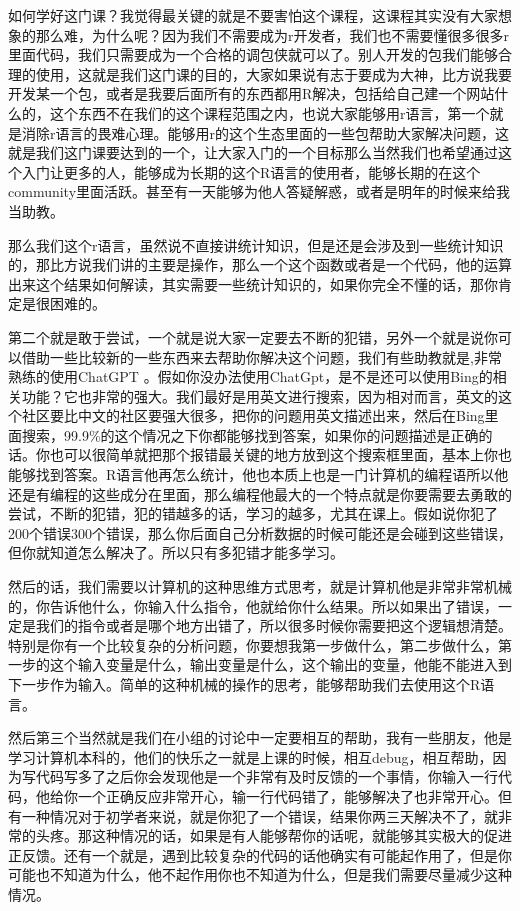\documentclass[
  oneside]{book}
\begin{document}
如何学好这门课？我觉得最关键的就是不要害怕这个课程，这课程其实没有大家想象的那么难，为什么呢？因为我们不需要成为r开发者，我们也不需要懂很多很多r里面代码，我们只需要成为一个合格的调包侠就可以了。别人开发的包我们能够合理的使用，这就是我们这门课的目的，大家如果说有志于要成为大神，比方说我要开发某一个包，或者是我要后面所有的东西都用R解决，包括给自己建一个网站什么的，这个东西不在我们的这个课程范围之内，也说大家能够用r语言，第一个就是消除r语言的畏难心理。能够用r的这个生态里面的一些包帮助大家解决问题，这就是我们这门课要达到的一个，让大家入门的一个目标那么当然我们也希望通过这个入门让更多的人，能够成为长期的这个R语言的使用者，能够长期的在这个community里面活跃。甚至有一天能够为他人答疑解惑，或者是明年的时候来给我当助教。

那么我们这个r语言，虽然说不直接讲统计知识，但是还是会涉及到一些统计知识的，那比方说我们讲的主要是操作，那么一个这个函数或者是一个代码，他的运算出来这个结果如何解读，其实需要一些统计知识的，如果你完全不懂的话，那你肯定是很困难的。

第二个就是敢于尝试，一个就是说大家一定要去不断的犯错，另外一个就是说你可以借助一些比较新的一些东西来去帮助你解决这个问题，我们有些助教就是,非常熟练的使用ChatGPT
。假如你没办法使用ChatGpt，是不是还可以使用Bing的相关功能？它也非常的强大。我们最好是用英文进行搜索，因为相对而言，英文的这个社区要比中文的社区要强大很多，把你的问题用英文描述出来，然后在Bing里面搜索，99.9\%的这个情况之下你都能够找到答案，如果你的问题描述是正确的话。你也可以很简单就把那个报错最关键的地方放到这个搜索框里面，基本上你也能够找到答案。R语言他再怎么统计，他也本质上也是一门计算机的编程语所以他还是有编程的这些成分在里面，那么编程他最大的一个特点就是你要需要去勇敢的尝试，不断的犯错，犯的错越多的话，学习的越多，尤其在课上。假如说你犯了200个错误300个错误，那么你后面自己分析数据的时候可能还是会碰到这些错误，但你就知道怎么解决了。所以只有多犯错才能多学习。

然后的话，我们需要以计算机的这种思维方式思考，就是计算机他是非常非常机械的，你告诉他什么，你输入什么指令，他就给你什么结果。所以如果出了错误，一定是我们的指令或者是哪个地方出错了，所以很多时候你需要把这个逻辑想清楚。特别是你有一个比较复杂的分析问题，你要想我第一步做什么，第二步做什么，第一步的这个输入变量是什么，输出变量是什么，这个输出的变量，他能不能进入到下一步作为输入。简单的这种机械的操作的思考，能够帮助我们去使用这个R语言。

然后第三个当然就是我们在小组的讨论中一定要相互的帮助，我有一些朋友，他是学习计算机本科的，他们的快乐之一就是上课的时候，相互debug，相互帮助，因为写代码写多了之后你会发现他是一个非常有及时反馈的一个事情，你输入一行代码，他给你一个正确反应非常开心，输一行代码错了，能够解决了也非常开心。但有一种情况对于初学者来说，就是你犯了一个错误，结果你两三天解决不了，就非常的头疼。那这种情况的话，如果是有人能够帮你的话呢，就能够其实极大的促进正反馈。还有一个就是，遇到比较复杂的代码的话他确实有可能起作用了，但是你可能也不知道为什么，他不起作用你也不知道为什么，但是我们需要尽量减少这种情况。
\end{document}
